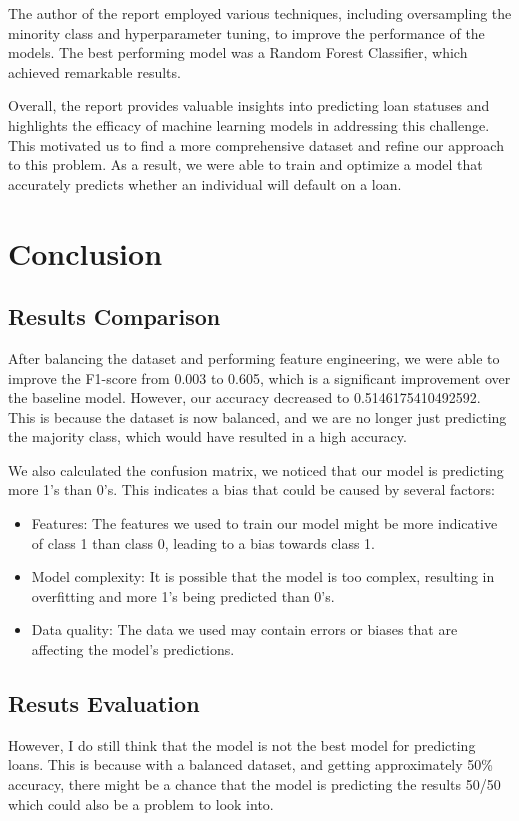 \documentclass[sigplan]{acmart}
\begin{document}
The author of the report employed various techniques, including oversampling the minority class and hyperparameter tuning, to improve the performance of the models. The best performing model was a Random Forest Classifier, which achieved remarkable results.

Overall, the report provides valuable insights into predicting loan statuses and highlights the efficacy of machine learning models in addressing this challenge. This motivated us to find a more comprehensive dataset and refine our approach to this problem. As a result, we were able to train and optimize a model that accurately predicts whether an individual will default on a loan.

\section{Conclusion}
\subsection{Results Comparison}
After balancing the dataset and performing feature engineering, we were able to improve the F1-score from 0.003 to 0.605, which is a significant improvement over the baseline model. However, our accuracy decreased to 0.5146175410492592. This is because the dataset is now balanced, and we are no longer just predicting the majority class, which would have resulted in a high accuracy.

We also calculated the confusion matrix, we noticed that our model is predicting more 1's than 0's. This indicates a bias that could be caused by several factors:

\begin{itemize}
    \item  Features: The features we used to train our model might be more indicative of class 1 than class 0, leading to a bias towards class 1.
    \item  Model complexity: It is possible that the model is too complex, resulting in overfitting and more 1's being predicted than 0's.
    \item  Data quality: The data we used may contain errors or biases that are affecting the model's predictions.
\end{itemize}

\subsection{Resuts Evaluation}
However, I do still think that the model is not the best model for predicting loans. This is because with a balanced dataset, and getting approximately
50\% accuracy, there might be a chance that the model is predicting the results 50/50 which could also be a problem to look into.
\end{document}
